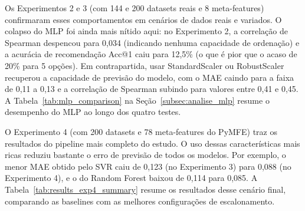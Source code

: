 \documentclass[12pt]{article}
\begin{document}
Os Experimentos 2 e 3 (com 144 e 200 datasets reais e 8 meta-features) confirmaram esses comportamentos em cenários de dados reais e variados. O colapso do MLP foi ainda mais nítido aqui: no Experimento 2, a correlação de Spearman despencou para 0,034 (indicando nenhuma capacidade de ordenação) e a acurácia de recomendação Acc@1 caiu para 12,5\% (o que é pior que o acaso de 20\% para 5 opções). Em contrapartida, usar StandardScaler ou RobustScaler recuperou a capacidade de previsão do modelo, com o MAE caindo para a faixa de 0,11 a 0,13 e a correlação de Spearman subindo para valores entre 0,41 e 0,45. A Tabela~\ref{tab:mlp_comparison} na Seção~\ref{subsec:analise_mlp} resume o desempenho do MLP ao longo dos quatro testes.

O Experimento 4 (com 200 datasets e 78 meta-features do PyMFE) traz os resultados do pipeline mais completo do estudo. O uso dessas características mais ricas reduziu bastante o erro de previsão de todos os modelos. Por exemplo, o menor MAE obtido pelo SVR caiu de 0,123 (no Experimento 3) para 0,088 (no Experimento 4), e o do Random Forest baixou de 0,114 para 0,085. A Tabela~\ref{tab:results_exp4_summary} resume os resultados desse cenário final, comparando as baselines com as melhores configurações de escalonamento.
\end{document}
